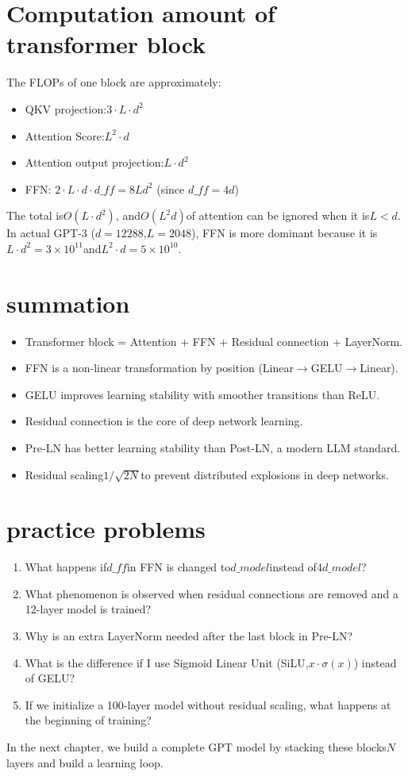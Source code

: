 \section{Computation amount of transformer block}

The FLOPs of one block are approximately:
\begin{itemize}
\item QKV projection:$3 \cdot L \cdot d^2$
\item Attention Score:$L^2 \cdot d$
\item Attention output projection:$L \cdot d^2$
  \item FFN: $2 \cdot L \cdot d \cdot d\_{ff} = 8 L d^2$ (since $d\_{ff} = 4d$)
\end{itemize}

The total is$O(L \cdot d^2)$, and$O(L^2 d)$of attention can be ignored when it is$L < d$. In actual GPT-3 ($d = 12288$,$L = 2048$), FFN is more dominant because it is$L \cdot d^2 = 3 \times 10^{11}$and$L^2 \cdot d = 5 \times 10^{10}$.

\section{summation}

\begin{itemize}
\item Transformer block = Attention + FFN + Residual connection + LayerNorm.
\item FFN is a non-linear transformation by position (Linear$\to$GELU$\to$Linear).
\item GELU improves learning stability with smoother transitions than ReLU.
\item Residual connection is the core of deep network learning.
\item Pre-LN has better learning stability than Post-LN, a modern LLM standard.
\item Residual scaling$1/\sqrt{2N}$to prevent distributed explosions in deep networks.
\end{itemize}

\section{practice problems}

\begin{enumerate}
\item What happens if$d\_{ff}$in FFN is changed to$d\_{model}$instead of$4d\_{model}$?
\item What phenomenon is observed when residual connections are removed and a 12-layer model is trained?
\item Why is an extra LayerNorm needed after the last block in Pre-LN?
\item What is the difference if I use Sigmoid Linear Unit (SiLU,$x \cdot \sigma(x)$) instead of GELU?
\item If we initialize a 100-layer model without residual scaling, what happens at the beginning of training?
\end{enumerate}

In the next chapter, we build a complete GPT model by stacking these blocks$N$layers and build a learning loop.
